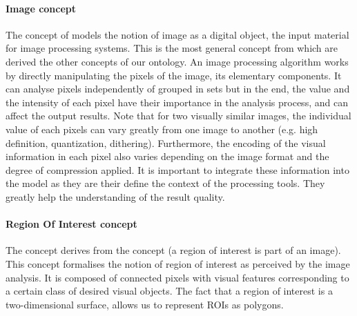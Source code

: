 \paragraph{Image concept} %
\label{par:image_concept}

The concept of  models the notion of image as a digital object, the input material for image processing systems.
This is the most general concept from which are derived the other concepts of our ontology.
An image processing algorithm works by directly manipulating the pixels of the image, its elementary components.
It can analyse pixels independently of grouped in sets but in the end, the value and the intensity of each pixel have their importance in the analysis process, and can affect the output results.
Note that for two visually similar images, the individual value of each pixels can vary greatly from one image to another (e.g. high definition, quantization, dithering).
Furthermore, the encoding of the visual information in each pixel also varies depending on the image format and the degree of compression applied.
It is important to integrate these information into the model as they are their define the context of the processing tools.
They greatly help the understanding of the result quality.

\paragraph{Region Of Interest concept} %
\label{par:region_concept}

The concept  derives from the concept  (a region of interest is part of an image).
This concept formalises the notion of region of interest as perceived by the image analysis.
It is composed of connected pixels with visual features corresponding to a certain class of desired visual objects.
The fact that a region of interest is a two-dimensional surface, allows us to represent ROIs as polygons.


